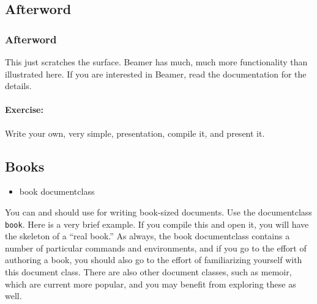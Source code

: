 \begin{realverbatim}
    \section{Afterword}
    \begin{frame}
        \frametitle{Afterword}
        This just scratches the surface. Beamer has much, much more functionality than illustrated here. If you are interested in Beamer, read the documentation for the details.
    \end{frame}

        \end{realverbatim}

        \paragraph{Exercise:} Write your own, very simple, presentation, compile it, and present it.


        \subsection{Books}
        \label{Books}
        
        \begin{framed}
            \begin{itemize}
                \item{book documentclass}
            \end{itemize}
        \end{framed}

        You can and should use \Lx{} for writing book-sized documents. Use the documentclass \texttt{book}. Here is a very brief example. If you compile this and open it, you will have the skeleton of a ``real book.'' As always, the book documentclass contains a number of particular commands and environments, and if you go to the effort of authoring a book, you should also go to the effort of familiarizing yourself with this document class. There are also other document classes, such as memoir, which are current more popular, and you may benefit from exploring these as well.

